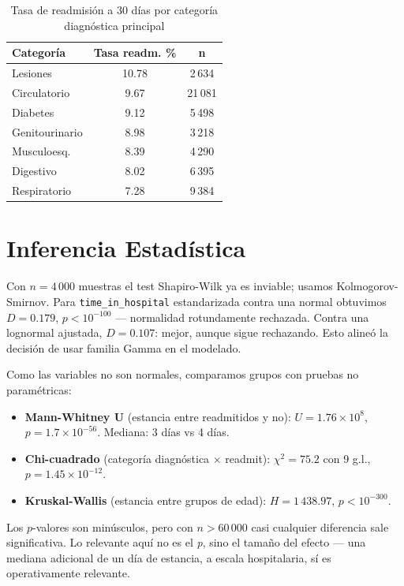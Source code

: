 \documentclass[conference]{IEEEtran}
\begin{document}
\begin{table}[H]
\caption{Tasa de readmisión a 30 días por categoría diagnóstica principal}
\label{tab:readdiag}
\centering
\begin{tabular}{lcc}
\toprule
\textbf{Categoría} & \textbf{Tasa readm. \%} & \textbf{n} \\
\midrule
Lesiones        & 10.78 & 2\,634 \\
Circulatorio    & 9.67  & 21\,081 \\
Diabetes        & 9.12  & 5\,498 \\
Genitourinario  & 8.98  & 3\,218 \\
Musculoesq.     & 8.39  & 4\,290 \\
Digestivo       & 8.02  & 6\,395 \\
Respiratorio    & 7.28  & 9\,384 \\
\bottomrule
\end{tabular}
\end{table}

\section{Inferencia Estadística}
Con $n = 4\,000$ muestras el test Shapiro-Wilk ya es inviable; usamos Kolmogorov-Smirnov. Para \texttt{time\_in\_hospital} estandarizada contra una normal obtuvimos $D = 0.179$, $p < 10^{-100}$ --- normalidad rotundamente rechazada. Contra una lognormal ajustada, $D = 0.107$: mejor, aunque sigue rechazando. Esto alineó la decisión de usar familia Gamma en el modelado.

Como las variables no son normales, comparamos grupos con pruebas no paramétricas:
\begin{itemize}
    \item \textbf{Mann-Whitney U} (estancia entre readmitidos y no): $U = 1.76\times 10^{8}$, $p = 1.7\times 10^{-56}$. Mediana: 3 días vs 4 días.
    \item \textbf{Chi-cuadrado} (categoría diagnóstica $\times$ readmit): $\chi^{2}=75.2$ con 9 g.l., $p = 1.45\times 10^{-12}$.
    \item \textbf{Kruskal-Wallis} (estancia entre grupos de edad): $H = 1\,438.97$, $p < 10^{-300}$.
\end{itemize}

Los $p$-valores son minúsculos, pero con $n > 60\,000$ casi cualquier diferencia sale significativa. Lo relevante aquí no es el \textit{p}, sino el tamaño del efecto --- una mediana adicional de un día de estancia, a escala hospitalaria, sí es operativamente relevante.
\end{document}
